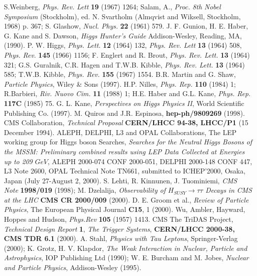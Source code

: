 \documentclass[a4paper,12pt,titlepage]{article}
\begin{document}
\begin{thebibliography}{99}
 S.Weinberg, \emph{Phys. Rev. Lett} {\bf 19} (1967) 1264; Salam, A., \emph{Proc. 8th Nobel Symposium} (Stockholm), ed. N. Svartholm (Almqvist and Wiksell, Stockholm, 1968) p. 367; S. Glashow, \emph{Nucl. Phys.} {\bf 22} (1961) 579.
 J. F. Gunion, H. E. Haber, G. Kane and S. Dawson, \emph{Higgs Hunter's Guide} Addison-Wesley, Reading, MA, (1990).  
 P. W. Higgs, \emph{Phys. Lett.} {\bf 12} (1964) 132, \emph{Phys. Rev. Lett} {\bf 13} (1964) 508, \emph{Phys. Rev.} {\bf 145} (1966) 1156; F. Englert and R. Brout, \emph{Phys. Rev. Lett.} {\bf 13} (1964) 321; G.S. Guralnik, C.R. Hagen and T.W.B. Kibble, \emph{Phys. Rev. Lett.} {\bf 13} (1964) 585; T.W.B. Kibble, \emph{Phys. Rev.} {\bf 155} (1967) 1554.
 B.R. Martin and G. Shaw, \emph{Particle Physics}, Wiley \& Sons (1997).
 H.P. Nilles, \emph{Phys. Rep.} {\bf 110} (1984) 1; R.Barbieri, \emph{Riv. Nuovo Cim.} {\bf 11} (1988) 1; H.E. Haber and G.L. Kane, \emph{Phys. Rep.} {\bf 117C} (1985) 75.  
 G. L. Kane, \emph{Perspectives on Higgs Physics II}, World Scientific Publishing Co. (1997). 
 M. Quiros and J.R. Espinosa, {\bf hep-ph/9809269} (1998).
 CMS Collaboration, \emph{Technical Proposal} {\bf CERN/LHCC 94-38, LHCC/P1} (15 December 1994). 
 ALEPH, DELPHI, L3 and OPAL Collaborations, The LEP working group for Higgs boson Searches, \emph{Searches for the Neutral Higgs Bosons of the MSSM: Preliminary combined results using LEP Data Collected at Energies up to 209 $GeV$}, ALEPH 2000-074 CONF 2000-051, DELPHI 2000-148 CONF 447, L3 Note 2600, OPAL Technical Note TN661, submitted to ICHEP'2000, Osaka, Japan (July 27-August 2, 2000).
 S. Lehti, R. Kinnunen, J. Tuominiemi, \emph{CMS Note} {\bf 1998/019} (1998); M. Dzelalija, \emph{Observability of $H_{SUSY} \rightarrow \tau \tau$ Decays in CMS at the LHC} {\bf CMS CR 2000/009} (2000). 
 D. E. Groom et al., \emph{Review of Particle Physics}, The European Physical Journal {\bf C15}, 1 (2000).
 Wu, Ambler, Hayward, Hoppes and Hudson, \emph{Phys.Rev} {\bf 105} (1957) 1413.
 CMS The TriDAS Project, \emph{Technical Design Report} {\bf 1}, \emph{The Trigger Systems}, {\bf CERN/LHCC 2000-38, CMS TDR 6.1} (2000).
 A. Stahl, \emph{Physics with Tau Leptons}, Springer-Verlag (2000); K. Grotz, H. V. Klapdor, \emph{The Weak Interaction in Nuclear, Particle and Astrophysics}, IOP Publishing Ltd (1990); W. E. Burcham and M. Jobes, \emph{Nuclear and Particle Physics}, Addison-Wesley (1995).

\end{thebibliography}
\end{document}
